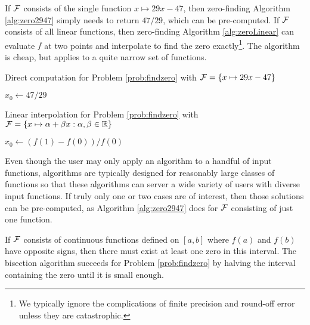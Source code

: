 If $\mathcal{F}$ consists of the single function $x \mapsto 29x - 47$, then zero-finding Algorithm \ref{alg:zero2947} simply needs to return $47/29$, which can be pre-computed.  If $\mathcal{F}$ consists of all linear functions, then zero-finding Algorithm \ref{alg:zeroLinear} can evaluate $f$ at two points and interpolate to find the zero exactly\footnote{We typically ignore the complications of finite precision and round-off error unless they are catastrophic.}.  The algorithm is cheap, but applies to a quite narrow set of functions.  

\begin{algorithm}[H]
\caption{Direct computation for Problem \ref{prob:findzero} with $\mathcal{F} = \{x \mapsto 29x - 47 \}$ \label{alg:zero2947}}
	\begin{algorithmic}
    \RETURN $x_0 \leftarrow 47/29$
    \end{algorithmic}
\end{algorithm}

\begin{algorithm}[H]
\caption{Linear interpolation for Problem \ref{prob:findzero} with $\mathcal{F} = \{x \mapsto \alpha  + \beta x : \alpha, \beta \in \mathbb{R}\}$ \label{alg:zeroLinear}}
	\begin{algorithmic}
    \RETURN $x_0 \leftarrow (f(1) - f(0))/f(0)$
    \end{algorithmic}
\end{algorithm}

Even though the user may only apply an algorithm to a handful of input functions, algorithms are typically designed for reasonably large classes of functions so that these algorithms can server a wide variety of users with diverse input functions.  If truly only one or two cases are of interest, then those solutions can be pre-computed, as Algorithm \ref{alg:zero2947} does for $\mathcal{F}$ consisting of just one function.

If $\mathcal{F}$ consists of continuous functions defined on $[a,b]$ where $f(a)$ and $f(b)$ have opposite signs, then there must exist at least one zero in this interval.  The bisection algorithm succeeds for Problem \ref{prob:findzero} by halving the interval containing the zero until it is small enough.

